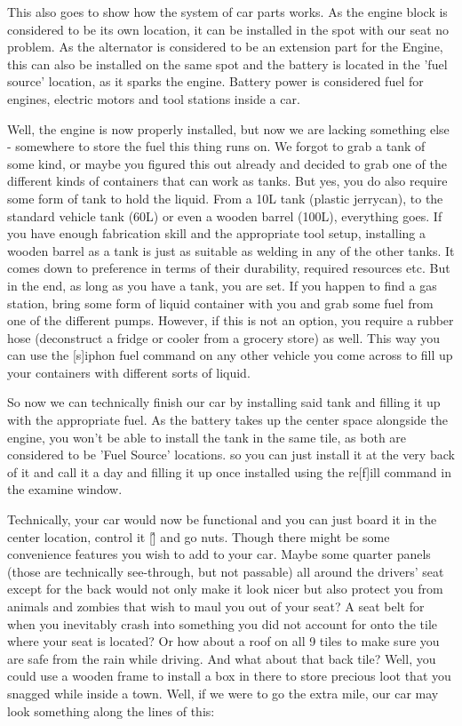 \documentclass[11pt]{report}
\begin{document}
This also goes to show how the system of car parts works. As the engine block is considered to be its own location, it can be installed in the spot with our seat no problem. As the alternator is considered to be an extension part for the Engine, this can also be installed on the same spot and the battery is located in the 'fuel source' location, as it sparks the engine. Battery power is considered fuel for engines, electric motors and tool stations inside a car.

Well, the engine is now properly installed, but now we are lacking something else - somewhere to store the fuel this thing runs on. We forgot to grab a tank of some kind, or maybe you figured this out already and decided to grab one of the different kinds of containers that can work as tanks. But yes, you do also require some form of tank to hold the liquid. From a 10L tank (plastic jerrycan), to the standard vehicle tank (60L) or even a wooden barrel (100L), everything goes. If you have enough fabrication skill and the appropriate tool setup, installing a wooden barrel as a tank is just as suitable as welding in any of the other tanks. It comes down to preference in terms of their durability, required resources etc. But in the end, as long as you have a tank, you are set. If you happen to find a gas station, bring some form of liquid container with you and grab some fuel from one of the different pumps. However, if this is not an option, you require a rubber hose (deconstruct a fridge or cooler from a grocery store) as well. This way you can use the [s]iphon fuel command on any other vehicle you come across to fill up your containers with different sorts of liquid.

So now we can technically finish our car by installing said tank and filling it up with the appropriate fuel. As the battery takes up the center space alongside the engine, you won't be able to install the tank in the same tile, as both are considered to be 'Fuel Source' locations. so you can just install it at the very back of it and call it a day and filling it up once installed using the re[f]ill command in the examine window.

Technically, your car would now be functional and you can just board it in the center location, control it [\^] and go nuts. Though there might be some convenience features you wish to add to your car. Maybe some quarter panels (those are technically see-through, but not passable) all around the drivers' seat except for the back would not only make it look nicer but also protect you from animals and zombies that wish to maul you out of your seat? A seat belt for when you inevitably crash into something you did not account for onto the tile where your seat is located? Or how about a roof on all 9 tiles to make sure you are safe from the rain while driving. And what about that back tile? Well, you could use a wooden frame to install a box in there to store precious loot that you snagged while inside a town.
Well, if we were to go the extra mile, our car may look something along the lines of this:
\end{document}
